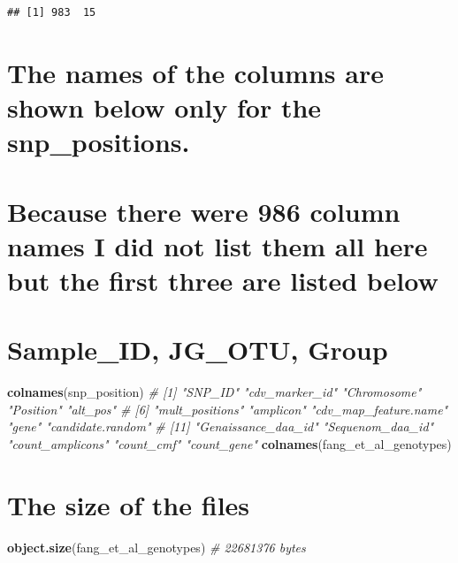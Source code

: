 \documentclass[
]{article}
\newenvironment{Shaded}{\begin{snugshade}}{\end{snugshade}}
\newcommand{\CommentTok}[1]{\textcolor[rgb]{0.56,0.35,0.01}{\textit{#1}}}
\newcommand{\FunctionTok}[1]{\textcolor[rgb]{0.13,0.29,0.53}{\textbf{#1}}}
\newcommand{\NormalTok}[1]{#1}
\begin{document}
\begin{verbatim}
## [1] 983  15
\end{verbatim}

\section{The names of the columns are shown below only for the
snp\_positions.}\label{the-names-of-the-columns-are-shown-below-only-for-the-snp_positions.}

\section{Because there were 986 column names I did not list them all
here but the first three are listed
below}\label{because-there-were-986-column-names-i-did-not-list-them-all-here-but-the-first-three-are-listed-below}

\section{Sample\_ID, JG\_OTU, Group}\label{sample_id-jg_otu-group}

\begin{Shaded}
\begin{Highlighting}[]
\FunctionTok{colnames}\NormalTok{(snp\_position) }\CommentTok{\# [1] "SNP\_ID"               "cdv\_marker\_id"        "Chromosome"           "Position"             "alt\_pos"             }
                       \CommentTok{\# [6] "mult\_positions"       "amplicon"             "cdv\_map\_feature.name" "gene"                 "candidate.random"    }
                       \CommentTok{\# [11] "Genaissance\_daa\_id"   "Sequenom\_daa\_id"      "count\_amplicons"      "count\_cmf"            "count\_gene"          }
\FunctionTok{colnames}\NormalTok{(fang\_et\_al\_genotypes)}
\end{Highlighting}
\end{Shaded}

\section{The size of the files}\label{the-size-of-the-files}

\begin{Shaded}
\begin{Highlighting}[]
\FunctionTok{object.size}\NormalTok{(fang\_et\_al\_genotypes) }\CommentTok{\# 22681376 bytes}
\end{Highlighting}
\end{Shaded}
\end{document}

